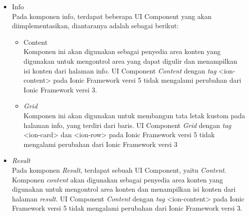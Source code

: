 \begin{itemize}
	\item Info \\
	Pada komponen info, terdapat beberapa UI Component yang akan diimplementasikan, diantaranya adalah sebagai berikut:
		\begin{itemize}
			\item Content \\
		Komponen ini akan digunakan sebagai penyedia area konten yang digunakan untuk mengontrol area yang dapat digulir dan menampilkan isi konten dari halaman info. UI Component \textit{Content} dengan \textit{tag} <ion-content> pada Ionic Framework versi 5 tidak mengalami perubahan dari Ionic Framework versi 3.
			\item \textit{Grid} \\
		Komponen ini akan digunakan untuk membangun tata letak kustom pada halaman info, yang terdiri dari baris. UI Component \textit{Grid} dengan \textit{tag} <ion-card> dan <ion-row> pada Ionic Framework versi 5 tidak mengalami perubahan dari Ionic Framework versi 3
		\end{itemize}
		
	\item \textit{Result} \\ 
	Pada komponen \textit{Result}, terdapat sebuah UI Component, yaitu \textit{Content}. Komponen \textit{content} akan digunakan sebagai penyedia area konten yang digunakan untuk mengontrol area konten dan menampilkan isi konten dari halaman \textit{result}. UI Component \textit{Content} dengan \textit{tag} <ion-content> pada Ionic Framework versi 5 tidak mengalami perubahan dari Ionic Framework versi 3. 
		
		\newpage
		

\end{itemize}
